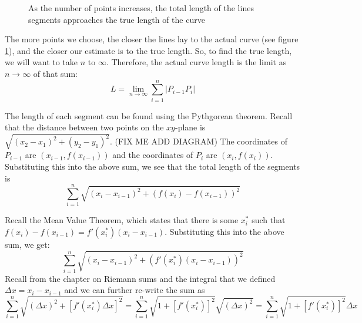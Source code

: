 \begin{figure}[htbp]
\centering
    \caption{As the number of points increases, the total length of the lines segments approaches the true length of the curve}
    \label{fig:points}
\end{figure}

The more points we choose, the closer the lines lay to the actual 
curve (see figure \ref{fig:points}), and the closer our estimate is 
to the true length. So, to find the true length, we will want to take 
$n$ to $\infty$. Therefore, the actual curve length is the limit as 
$n \to \infty$ of that sum:
$$L = \lim_{n \to \infty}\sum_{i=1}^n |P_{i-1}P_i|$$

The length of each segment can be found using the Pythgorean theorem. 
Recall that the distance between two points on the $xy$-plane is 
$\sqrt{(x_2 - x_1)^2 + (y_2 - y_1)^2}$. (FIX ME ADD DIAGRAM) The 
coordinates of $P_{i-1}$ are $(x_{i-1}, f(x_{i-1}))$ and the 
coordinates of $P_i$ are $(x_i, f(x_i))$. Substituting this into the 
above sum, we see that the total length of the segments is 
$$\sum_{i=1}^n \sqrt{(x_i - x_{i-1})^2 + (f(x_i) - f(x_{i-1}))^2}$$

Recall the Mean Value Theorem, which states that there is some 
$x_i^{\text{*}}$ such that $f(x_i) - f(x_{i-1}) = f'(x_i^{\text{*}})
(x_i - x_{i-1})$. Substituting this into the above sum, we get: 
$$\sum_{i=1}^n \sqrt{(x_i - x_{i-1})^2 + (f'(x_i^{\text{*}})(x_i - x_{i-1}))^2}$$ 
Recall from the chapter on Riemann sums and the integral that we 
defined $\Delta x = x_i - x_{i-1}$ and we can further re-write the 
sum as $$\sum_{i=1}^n \sqrt{(\Delta x)^2 + [f'(x_i^{\text{*}}) \Delta x]^2} 
= \sum_{i=1}^n \sqrt{1+[f'(x_i^{\text{*}})]^2}\sqrt{(\Delta x)^2} = 
\sum_{i=1}^n \sqrt{1+[f'(x_i^{\text{*}})]^2}\Delta x$$

